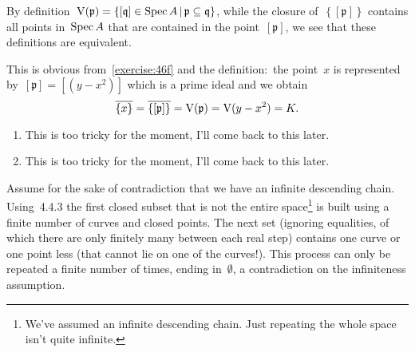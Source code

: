 \begin{exercise}
  \label{exercise:46f}
  By definition~$\operatorname{V}(\mathfrak{p})=\left\{ [\mathfrak{q}]\in\operatorname{Spec} A\,|\, \mathfrak{p}\subseteq\mathfrak{q}\right\}$, while the closure of~$\left\{ [\mathfrak{p}] \right\}$ contains all points in~$\operatorname{Spec} A$ that are contained in the point~$[\mathfrak{p}]$, we see that these definitions are equivalent.
\end{exercise}

\begin{exercise}
  This is obvious from~\autoref{exercise:46f} and the definition:~the point~$x$ is represented by~$[\mathfrak{p}]=[(y-x^2)]$ which is a prime ideal and we obtain
  \begin{equation}
    \overline{\left\{ x \right\}}=\overline{\left\{ [\mathfrak{p}] \right\}}=\operatorname{V}(\mathfrak{p})=\operatorname{V}(y-x^2)=K.
  \end{equation}
\end{exercise}

\begin{exercise} %
  \begin{enumerate}
    \item This is too tricky for the moment, I'll come back to this later.

    \item This is too tricky for the moment, I'll come back to this later.
  \end{enumerate}
\end{exercise}

\begin{exercise}
  Assume for the sake of contradiction that we have an infinite descending chain. Using~4.4.3 the first closed subset that is not the entire space\footnote{We've assumed an infinite descending chain. Just repeating the whole space isn't quite infinite.} is built using a finite number of curves and closed points. The next set (ignoring equalities, of which there are only finitely many between each real step) contains one curve or one point less (that cannot lie on one of the curves!). This process can only be repeated a finite number of times, ending in~$\emptyset$, a contradiction on the infiniteness assumption.
\end{exercise}

